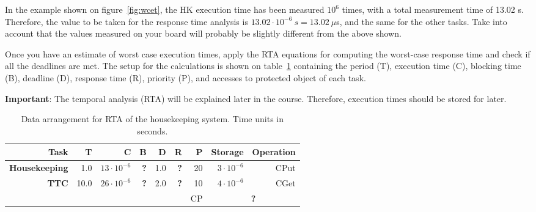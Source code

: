 In the example shown on figure~\ref{fig:wcet}, the HK execution time has been measured $10^{6}$ times, with a total measurement time of 13.02 s. Therefore, the value to be taken for the response time analysis is $13.02\cdot10^{-6}~s = 13.02~\mu${s}, and the same for the other tasks. Take into account that the values measured on your board will probably be slightly different from the above shown.

Once you have an estimate of worst case execution times, apply the RTA equations for computing the worst-case response time and check if all the deadlines are met. The setup for the calculations is shown on table~\ref{tb:wcet}
containing the period (T), execution time (C),
blocking time (B), deadline (D),
response time (R), priority (P),
and accesses to protected object of each task.

\textcolor{mRedBrown}{\textbf{Important}}: The temporal analysis (RTA) will be explained later in the course. Therefore, execution times should be stored for later. 

\begingroup
\setlength{\tabcolsep}{8pt} %
\renewcommand{\arraystretch}{1.2} %

\begin{table}[htb]
\begin{center}
	
	\small %
	
	\begin{tabular}{|r r r r r r r r r|} \hline
	\textbf{Task} & T & C & B & D & R & P & Storage & Operation\\ \hline
	
	\textbf{Housekeeping} & 1.0 & $13\cdot10^{-6}$ & \textcolor{mRedBrown}{\textbf{?}} & 1.0 & \textcolor{mRedBrown}{\textbf{?}} & 20 & $3\cdot10^{-6}$ & CPut \\
	
	\textbf{TTC} & 10.0 & $26\cdot10^{-6}$ & \textcolor{mRedBrown}{\textbf{?}} & 2.0 & \textcolor{mRedBrown}{\textbf{?}} & 10 & $4\cdot10^{-6}$ & CGet \\ \hline
	
	& & & & & & CP & \multicolumn{2}{|c|}{\textcolor{mRedBrown}{\textbf{?}}} \\ \hline
	\end{tabular}
	\caption{Data arrangement for RTA of the housekeeping system. Time units in seconds.}
	\label{tb:wcet}
\end{center}
\end{table}

\endgroup

